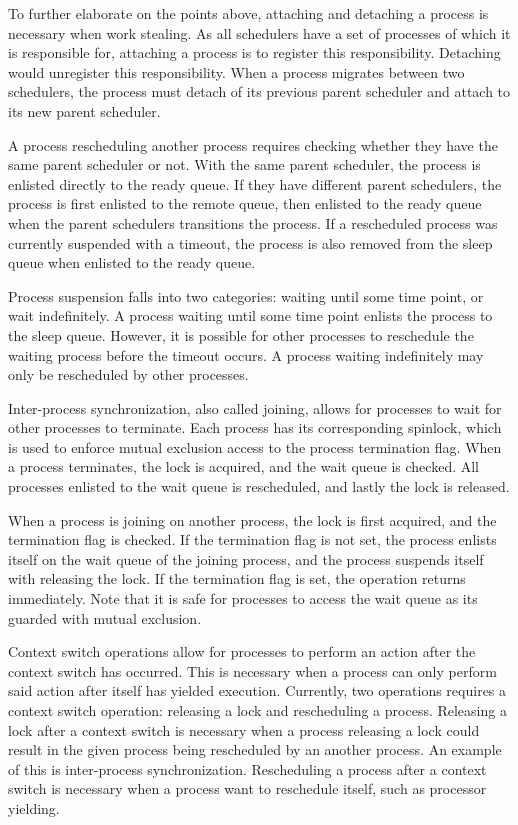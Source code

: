 To further elaborate on the points above, attaching and detaching a process is necessary when work stealing. As all schedulers have a set of processes of which it is responsible for, attaching a process is to register this responsibility. Detaching would unregister this responsibility. When a process migrates between two schedulers, the process must detach of its previous parent scheduler and attach to its new parent scheduler. 

A process rescheduling another process requires checking whether they have the same parent scheduler or not. With the same parent scheduler, the process is enlisted directly to the ready queue. If they have different parent schedulers, the process is first enlisted to the remote queue, then enlisted to the ready queue when the parent schedulers transitions the process. If a rescheduled process was currently suspended with a timeout, the process is also removed from the sleep queue when enlisted to the ready queue.

Process suspension falls into two categories: waiting until some time point, or wait indefinitely. A process waiting until some time point enlists the process to the sleep queue. However, it is possible for other processes to reschedule the waiting process before the timeout occurs. A process waiting indefinitely may only be rescheduled by other processes.

Inter\hyp{}process synchronization, also called joining, allows for processes to wait for other processes to terminate. Each process has its corresponding spinlock, which is used to enforce mutual exclusion access to the process termination flag. When a process terminates, the lock is acquired, and the wait queue is checked. All processes enlisted to the wait queue is rescheduled, and lastly the lock is released. 

When a process is joining on another process, the lock is first acquired, and the termination flag is checked. If the termination flag is not set, the process enlists itself on the wait queue of the joining process, and the process suspends itself with releasing the lock. If the termination flag is set, the operation returns immediately. Note that it is safe for processes to access the wait queue as its guarded with mutual exclusion.

Context switch operations allow for processes to perform an action after the context switch has occurred. This is necessary when a process can only perform said action after itself has yielded execution. Currently, two operations requires a context switch operation: releasing a lock and rescheduling a process. Releasing a lock after a context switch is necessary when a process releasing a lock could result in the given process being rescheduled by an another process. An example of this is inter\hyp{}process synchronization. Rescheduling a process after a context switch is necessary when a process want to reschedule itself, such as processor yielding.


